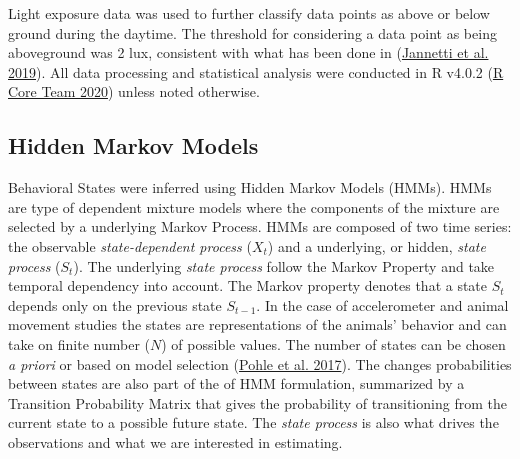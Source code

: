 \documentclass[english,msc,numbers,hidelinks]{coppe}
\begin{document}
  Light exposure data was used to further classify data points as above or below ground during the daytime. The threshold for considering a data point as being aboveground was 2 lux, consistent with what has been done in (\protect\hyperlink{ref-jannetti2019}{Jannetti et al. 2019}). All data processing and statistical analysis were conducted in R v4.0.2 (\protect\hyperlink{ref-rcoreteam2020}{R Core Team 2020}) unless noted otherwise.

  \hypertarget{hidden-markov-models}{%
  \subsection{Hidden Markov Models}\label{hidden-markov-models}}

  Behavioral States were inferred using Hidden Markov Models (HMMs). HMMs are type of dependent mixture models where the components of the mixture are selected by a underlying Markov Process. HMMs are composed of two time series: the observable \emph{state-dependent process} (\(X_t\)) and a underlying, or hidden, \emph{state process} (\(S_t\)). The underlying \emph{state process} follow the Markov Property and take temporal dependency into account. The Markov property denotes that a state \(S_t\) depends only on the previous state \(S_{t-1}\). In the case of accelerometer and animal movement studies the states are representations of the animals' behavior and can take on finite number (\(N\)) of possible values. The number of states can be chosen \emph{a priori} or based on model selection (\protect\hyperlink{ref-pohle2017}{Pohle et al. 2017}). The changes probabilities between states are also part of the of HMM formulation, summarized by a Transition Probability Matrix that gives the probability of transitioning from the current state to a possible future state. The \emph{state process} is also what drives the observations and what we are interested in estimating.
\end{document}
